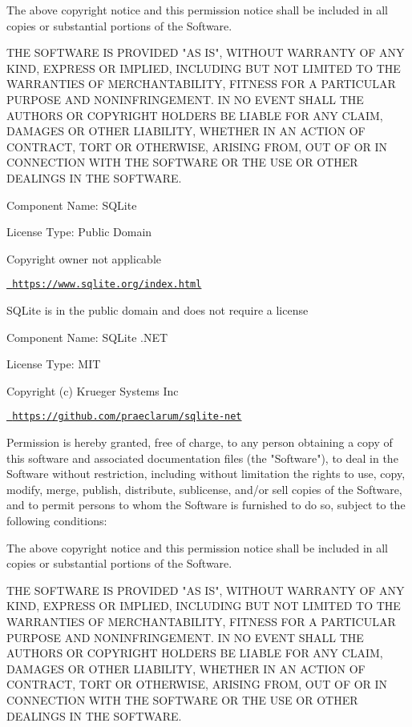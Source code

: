 The above copyright notice and this permission notice shall be included in all copies or substantial portions of the Software.

THE SOFTWARE IS PROVIDED "{}\+AS IS"{}, WITHOUT WARRANTY OF ANY KIND, EXPRESS OR IMPLIED, INCLUDING BUT NOT LIMITED TO THE WARRANTIES OF MERCHANTABILITY, FITNESS FOR A PARTICULAR PURPOSE AND NONINFRINGEMENT. IN NO EVENT SHALL THE AUTHORS OR COPYRIGHT HOLDERS BE LIABLE FOR ANY CLAIM, DAMAGES OR OTHER LIABILITY, WHETHER IN AN ACTION OF CONTRACT, TORT OR OTHERWISE, ARISING FROM, OUT OF OR IN CONNECTION WITH THE SOFTWARE OR THE USE OR OTHER DEALINGS IN THE SOFTWARE.

 Component Name\+: SQLite

License Type\+: Public Domain

Copyright owner not applicable

\href{https://www.sqlite.org/index.html}{\texttt{ https\+://www.\+sqlite.\+org/index.\+html}}

SQLite is in the public domain and does not require a license

 Component Name\+: SQLite .NET

License Type\+: MIT

Copyright (c) Krueger Systems Inc

\href{https://github.com/praeclarum/sqlite-net}{\texttt{ https\+://github.\+com/praeclarum/sqlite-\/net}}

Permission is hereby granted, free of charge, to any person obtaining a copy of this software and associated documentation files (the "{}\+Software"{}), to deal in the Software without restriction, including without limitation the rights to use, copy, modify, merge, publish, distribute, sublicense, and/or sell copies of the Software, and to permit persons to whom the Software is furnished to do so, subject to the following conditions\+:

The above copyright notice and this permission notice shall be included in all copies or substantial portions of the Software.

THE SOFTWARE IS PROVIDED "{}\+AS IS"{}, WITHOUT WARRANTY OF ANY KIND, EXPRESS OR IMPLIED, INCLUDING BUT NOT LIMITED TO THE WARRANTIES OF MERCHANTABILITY, FITNESS FOR A PARTICULAR PURPOSE AND NONINFRINGEMENT. IN NO EVENT SHALL THE AUTHORS OR COPYRIGHT HOLDERS BE LIABLE FOR ANY CLAIM, DAMAGES OR OTHER LIABILITY, WHETHER IN AN ACTION OF CONTRACT, TORT OR OTHERWISE, ARISING FROM, OUT OF OR IN CONNECTION WITH THE SOFTWARE OR THE USE OR OTHER DEALINGS IN THE SOFTWARE.

